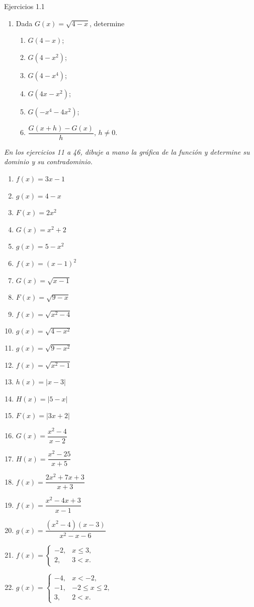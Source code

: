 \documentclass[aspectratio=169,10pt]{beamer}
\begin{document}
\begin{frame}{Ejercicios 1.1}
\begin{enumerate}
\item Dada $G(x)=\sqrt{4-x}$, determine
\begin{enumerate}
\item $G(4-x)$; \item $G(4-x^2)$; \item $G(4-x^4)$; \item $G(4x-x^2)$;
\item $G(-x^4-4x^2)$; \item $\dfrac{G(x+h)-G(x)}{h}$, $h\ne0$.
\end{enumerate}
\end{enumerate}

\textit{En los ejercicios 11 a 46, dibuje a mano la gráfica de la función y determine su dominio y su contradominio.}

\begin{enumerate}
\item $f(x)=3x-1$
\item $g(x)=4-x$
\item $F(x)=2x^2$
\item $G(x)=x^2+2$
\item $g(x)=5-x^2$
\item $f(x)=(x-1)^2$
\item $G(x)=\sqrt{x-1}$
\item $F(x)=\sqrt{9-x}$
\item $f(x)=\sqrt{x^2-4}$
\item $g(x)=\sqrt{4-x^2}$
\item $g(x)=\sqrt{9-x^2}$
\item $f(x)=\sqrt{x^2-1}$
\item $h(x)=|x-3|$
\item $H(x)=|5-x|$
\item $F(x)=|3x+2|$
\item $G(x)=\dfrac{x^2-4}{x-2}$
\item $H(x)=\dfrac{x^2-25}{x+5}$
\item $f(x)=\dfrac{2x^2+7x+3}{x+3}$
\item $f(x)=\dfrac{x^2-4x+3}{x-1}$
\item $g(x)=\dfrac{(x^2-4)(x-3)}{x^2-x-6}$
\item $f(x)=\begin{cases}-2,&x\le3,\\2,&3<x.\end{cases}$
\item $g(x)=\begin{cases}-4,&x<-2,\\-1,&-2\le x\le2,\\3,&2<x.\end{cases}$

\end{enumerate}
\end{frame}
\end{document}

